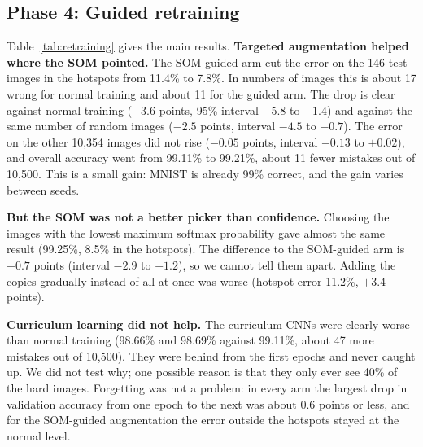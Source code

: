 \documentclass[11pt]{article}
\begin{document}
\subsection{Phase 4: Guided retraining}\label{sec:p4results}

Table~\ref{tab:retraining} gives the main results. \textbf{Targeted augmentation helped where the SOM pointed.} The SOM-guided arm cut the error on the 146 test images in the hotspots from 11.4\% to 7.8\%. In numbers of images this is about 17 wrong for normal training and about 11 for the guided arm.
The drop is clear against normal training ($-3.6$ points, 95\% interval $-5.8$ to $-1.4$) and against the same number of random images ($-2.5$ points, interval $-4.5$ to $-0.7$). The error on the other 10,354 images did not rise ($-0.05$ points, interval $-0.13$ to $+0.02$), and overall accuracy went from 99.11\% to 99.21\%, about 11 fewer mistakes out of 10,500. This is a small gain: MNIST is already 99\% correct, and the gain varies between seeds.

\textbf{But the SOM was not a better picker than confidence.} Choosing the images with the lowest maximum softmax probability gave almost the same result (99.25\%, 8.5\% in the hotspots). The difference to the SOM-guided arm is $-0.7$ points (interval $-2.9$ to $+1.2$), so we cannot tell them apart. Adding the copies gradually instead of all at once was worse (hotspot error 11.2\%, $+3.4$ points).

\textbf{Curriculum learning did not help.} The curriculum CNNs were clearly worse than normal training (98.66\% and 98.69\% against 99.11\%, about 47 more mistakes out of 10,500). They were behind from the first epochs and never caught up. We did not test why; one possible reason is that they only ever see 40\% of the hard images.
Forgetting was not a problem: in every arm the largest drop in validation accuracy from one epoch to the next was about 0.6 points or less, and for the SOM-guided augmentation the error outside the hotspots stayed at the normal level.
\end{document}
